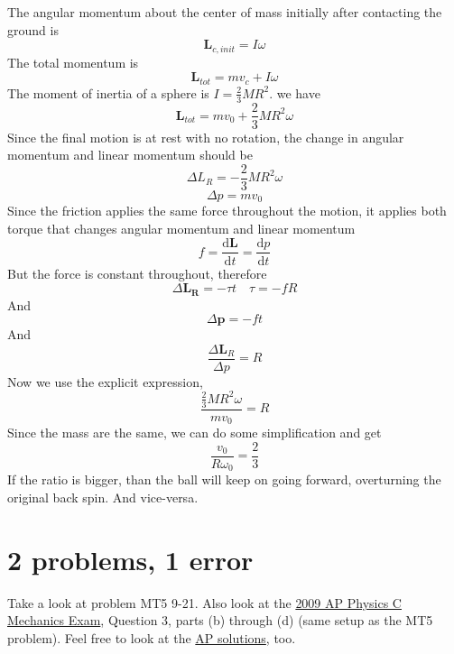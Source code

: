 \documentclass[12pt]{article}
\newcommand{\dydx}[2]{\frac{\text{d} #1}{\text{d} #2}}
\begin{document}
The angular momentum about the center of mass initially after contacting the ground is
\[
\mathbf{L}_{c,init} = I\omega 
\]
The total momentum is 
\[
\mathbf{L}_{tot} = mv_c + I\omega
\]
The moment of inertia of a sphere is $I = \frac{2}{3}MR^2$. we have
\[
\mathbf{L}_{tot} = mv_0 + \frac{2}{3}MR^2\omega
\]
Since the final motion is at rest with no rotation, the change in angular momentum and linear momentum should be
\[
\Delta L_R = - \frac{2}{3}MR^2\omega
\]
\[
\Delta p = mv_0
\]
Since the friction applies the same force throughout the motion, it applies both torque that changes angular momentum and linear momentum
\[
f = \dydx{\mathbf{L}}{t} = \dydx{p}{t}
\]
But the force is constant throughout, therefore
\[
\Delta \mathbf{L_R} = -\tau t \quad \tau = -fR 
\]
And 
\[
\Delta \mathbf{p} = -ft
\]
And 
\[
\frac{\Delta\mathbf{L}_R}{\Delta p} = R
\]
Now we use the explicit expression,
\[
\frac{\frac{2}{3}MR^2\omega}{mv_0} = R
\]
Since the mass are the same, we can do some simplification and get
\[
\frac{v_0}{R\omega_0} = \frac{2}{3}
\]
If the ratio is bigger, than the ball will keep on going forward, overturning the original back spin. And vice-versa. 



\newpage
\section{2 problems, 1 error}

Take a look at problem MT5 9-21. Also look at the \textcolor{blue}{\hyperlink{https://secure-media.collegeboard.org/apc/ap09_frq_physics_c_mech.pdf}{2009 AP Physics C Mechanics Exam}}, Question 3, parts (b) through (d) (same setup as the MT5 problem). Feel free to look at the \textcolor{blue}{\hyperlink{https://secure-media.collegeboard.org/apc/ap09_physics_c_mechanics_sgs.pdf}{AP solutions}}, too.
\end{document}
